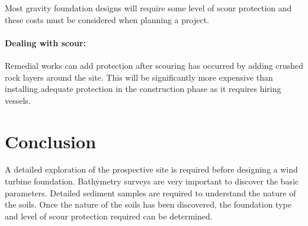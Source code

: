 \documentclass[12pt]{article} %
\begin{document}
Most gravity foundation designs will require some level of scour protection and these costs must be considered when planning a project.

\paragraph{Dealing with scour:}
Remedial works can add protection after scouring has occurred by adding crushed rock layers around the site. This will be significantly more expensive than installing adequate protection in the construction phase as it requires hiring vessels.


\section{Conclusion} %
A detailed exploration of the prospective site is required before designing a wind turbine foundation. Bathymetry surveys are very important to discover the basic parameters. Detailed sediment samples are required to understand the nature of the soils. 
Once the nature of the soils has been discovered, the foundation type and level of scour protection required can be determined.

\printbibliography

\end{document}

